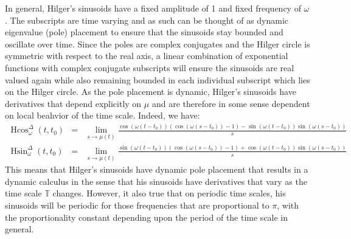 \documentclass[reqno]{amsart}
\theoremstyle{plain}
\theoremstyle{definition}
\numberwithin{theorem}{section}
\numberwithin{definition}{section}
\numberwithin{prop}{section}
\numberwithin{example}{section}
\newcommand{\T}{\ensuremath{\mathbb{T}}}
\DeclareMathOperator{\Hcos}{Hcos} %
\DeclareMathOperator{\Hsin}{Hsin}
\begin{document}
In general, Hilger's sinusoids have a fixed amplitude of 1 and fixed frequency of $\omega$.  The subscripts are time varying and as such can be thought of as dynamic eigenvalue (pole) placement to ensure that the sinusoids stay bounded and oscillate over time. Since the poles are complex conjugates and the Hilger circle is symmetric with respect to the real axis, a linear combination of exponential functions with complex conjugate subscripts will ensure the sinusoids are real valued again while also remaining bounded in each individual subscript which lies on the Hilger circle. As the pole placement is dynamic, Hilger's sinusoids have derivatives that depend explicitly on $\mu$ and are therefore in some sense dependent on local beahvior of the time scale.  Indeed, we have:
\begin{eqnarray*}
\Hcos_{\omega}^{\Delta}(t,t_0) &= & \lim_{s\to \mu(t)}\frac{\cos (\omega (t-t_0))(\cos (\omega(s-t_0))-1) -\sin(\omega(t-t_0))\sin(\omega(s-t_0))}{s} \\
\Hsin_{\omega}^{\Delta}(t,t_0) & = & \lim_{s\to \mu(t)}\frac{\sin (\omega (t-t_0))(\cos (\omega(s-t_0))-1) +\cos(\omega(t-t_0))\sin(\omega(s-t_0))}{s}
\end{eqnarray*}
This means that Hilger's sinusoids have dynamic pole placement that results in a dynamic calculus in the sense that his sinusoids have derivatives that vary as the time scale $\T$ changes.  However, it also true that on periodic time scales, his sinusoids will be periodic for those frequencies that are proportional to $\pi$, with the proportionality constant depending upon the period of the time scale in general.
\end{document}
